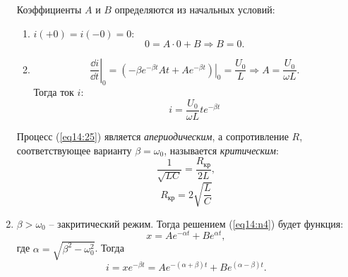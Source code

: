 \begin{enumerate}
            Коэффициенты \( A \) и \( B \) определяются из начальных условий:
            \begin{enumerate}
                \item \( i(+0) = i(-0) = 0: \)
                    \[
                        0 = A\cdot0 + B \Rightarrow B = 0.
                    \]
            
                \item
                    \[
                        \left.\frac{\dd i}{\dd t}\right|_0 =
                        \left.(-\beta e^{-\beta t}At + Ae^{-\beta t})\right|_0 =
                        \frac{U_0}{L} \Rightarrow A = \frac{U_0}{\omega L}.
                    \]
                    Тогда ток \( i \):
                    \begin{equation}
                        i = \frac{U_0}{\omega L}te^{-\beta t} \label{eq14:25}
                    \end{equation}
            \end{enumerate}
            
            Процесс (\ref{eq14:25}) является \textit{апериодическим}, а
            сопротивление \( R \), соответствующее варианту
            \( \beta = \omega_0 \), называется \textit{критическим}:
            \[
                \frac{1}{\sqrt{LC}} = \frac{R_{\textit{кр}}}{2L},
            \]
            \begin{equation}
                R_{\textit{кр}} = 2\sqrt{\frac{L}{C}}
            \end{equation}
        
        
        \item \( \beta > \omega_0 \) -- закритический режим.
            Тогда решением (\ref{eq14:n4}) будет функция:
            \[
                x = Ae^{-\alpha t} + Be^{\alpha t},
            \]
            где \( \alpha = \sqrt{\beta^2 - \omega_0^2} \).
            Тогда
            \[
                i = xe^{-\beta t} = Ae^{-(\alpha + \beta) t} +
                Be^{(\alpha - \beta) t}.
            \]
    \end{enumerate}
